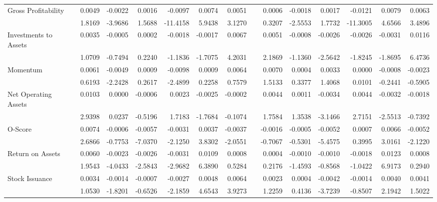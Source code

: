 \begin{table}[htbp]
{\begin{tabular}{lrrrrrrrrrrrrr}
      Gross Profitability & 0.0049 & -0.0022 & 0.0016 & -0.0097 & 0.0074 & 0.0051 &       & 0.0006 & -0.0018 & 0.0017 & -0.0121 & 0.0079 & 0.0063 \\
            & 1.8169 & -3.9686 & 1.5688 & -11.4158 & 5.9438 & 3.1270 &       & 0.3207 & -2.5553 & 1.7732 & -11.3005 & 4.6566 & 3.4896 \\
      Investments to Assets & 0.0035 & -0.0005 & 0.0002 & -0.0018 & -0.0017 & 0.0067 &       & 0.0051 & -0.0008 & -0.0026 & -0.0026 & -0.0031 & 0.0116 \\
            & 1.0709 & -0.7494 & 0.2240 & -1.1836 & -1.7075 & 4.2031 &       & 2.1869 & -1.1360 & -2.5642 & -1.8245 & -1.8695 & 6.4736 \\
      Momentum & 0.0061 & -0.0049 & 0.0009 & -0.0098 & 0.0009 & 0.0064 &       & 0.0070 & 0.0004 & 0.0033 & 0.0000 & -0.0008 & -0.0023 \\
            & 0.6193 & -2.2428 & 0.2617 & -2.4899 & 0.2258 & 0.7579 &       & 1.5133 & 0.3377 & 1.4068 & 0.0101 & -0.2441 & -0.5905 \\
      Net Operating Assets & 0.0103 & 0.0000 & -0.0006 & 0.0023 & -0.0025 & -0.0002 &       & 0.0044 & 0.0011 & -0.0034 & 0.0044 & -0.0032 & -0.0018 \\
            & 2.9398 & 0.0237 & -0.5196 & 1.7183 & -1.7684 & -0.1074 &       & 1.7584 & 1.3538 & -3.1466 & 2.7151 & -2.5513 & -0.7392 \\
      O-Score & 0.0074 & -0.0006 & -0.0057 & -0.0031 & 0.0037 & -0.0037 &       & -0.0016 & -0.0005 & -0.0052 & 0.0007 & 0.0066 & -0.0052 \\
            & 2.6866 & -0.7753 & -7.0370 & -2.1250 & 3.8302 & -2.0551 &       & -0.7067 & -0.5301 & -5.4575 & 0.3995 & 3.0161 & -2.1220 \\
      Return on Assets & 0.0060 & -0.0023 & -0.0026 & -0.0031 & 0.0109 & 0.0008 &       & 0.0004 & -0.0010 & -0.0010 & -0.0018 & 0.0123 & 0.0008 \\
            & 1.9543 & -4.0433 & -2.5843 & -2.9682 & 6.3890 & 0.5284 &       & 0.2176 & -1.4593 & -0.8568 & -1.0422 & 6.9173 & 0.2940 \\
      Stock Issuance & 0.0034 & -0.0014 & -0.0007 & -0.0027 & 0.0048 & 0.0064 &       & 0.0023 & 0.0004 & -0.0042 & -0.0014 & 0.0040 & 0.0041 \\
            & 1.0530 & -1.8201 & -0.6526 & -2.1859 & 4.6543 & 3.9273 &       & 1.2259 & 0.4136 & -3.7239 & -0.8507 & 2.1942 & 1.5022 \\
      \bottomrule
      \end{tabular}%
    }
    \label{tab:vol-ff5}%
  \end{table}%

